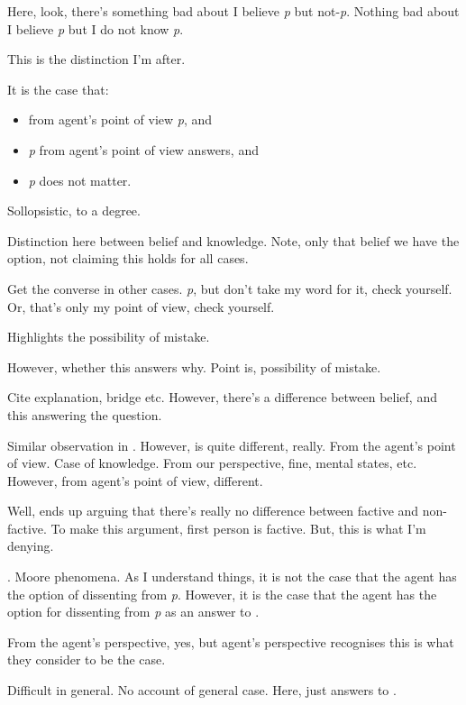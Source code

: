\begin{note}
  \citeauthor{Moore:1993wk}
  Here, look, there's something bad about I believe \emph{p} but not-\emph{p}.
  Nothing bad about I believe \emph{p} but I do not know \emph{p}.

  This is the distinction I'm after.
\end{note}

\begin{note}[Distinction]
  It is the case that:
  \begin{itemize}
  \item
    from agent's point of view \emph{p}, and
  \item
    \emph{p} from agent's point of view answers, and
  \item
    \emph{p} does not matter.
  \end{itemize}

  Sollopsistic, to a degree.

  Distinction here between belief and knowledge.
  Note, only that belief we have the option, not claiming this holds for all cases.

  Get the converse in other cases.
  \emph{p}, but don't take my word for it, check yourself.
  Or, that's only my point of view, check yourself.

  Highlights the possibility of mistake.

  However, whether this answers why.
  Point is, possibility of mistake.

  Cite explanation, bridge etc.
  However, there's a difference between belief, and this answering the question.

  Similar observation in \textcite[132ish]{Dancy:2000aa}.
  However, \citeauthor{Dancy:2000aa} is quite different, really.
  From the agent's point of view.
  Case of knowledge.
  From our perspective, fine, mental states, etc.
  However, from agent's point of view, different.

  Well, \citeauthor{Dancy:2000aa} ends up arguing that there's really no difference between factive and non-factive.
  To make this argument, first person is factive.
  But, this is what I'm denying.

  \citeauthor{Collins:1997wn}.
  \textcite[108+]{Dancy:2000aa}
  Moore phenomena.
  As I understand things, it is not the case that the agent has the option of dissenting from \emph{p}.
  However, it is the case that the agent has the option for dissenting from \emph{p} as an answer to \qWhy{}.

  From the agent's perspective, yes, but agent's perspective recognises this is what they consider to be the case.

  Difficult in general.
  No account of general case.
  Here, just answers to \qzS{}.
\end{note}

